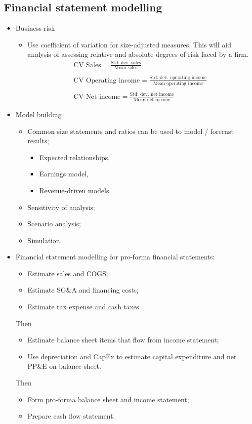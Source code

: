 \documentclass[../notes_compiled.tex]{subfiles}
\begin{document}
\subsection{Financial statement modelling}
\begin{itemize}
\item Business risk
\begin{itemize}
\item Use coefficient of variation for size-adjusted measures. This will aid analysis of assessing relative and absolute degrees of risk faced by a firm.
\begin{gather}
\text{CV Sales} = \frac{\text{Std. dev. sales}}{\text{Mean sales}} \\ \nonumber \\
\text{CV Operating income} = \frac{\text{Std. dev. operating income}}{\text{Mean operating income}} \\ \nonumber \\
\text{CV Net income} = \frac{\text{Std. dev. net income}}{\text{Mean net income}}
\end{gather}
\end{itemize}

\item Model building
\begin{itemize}
\item Common size statements and ratios can be used to model / forecast results;
\begin{itemize}
\item Expected relationships,
\item Earnings model,
\item Revenue-driven models.
\end{itemize}
\item Sensitivity of analysis;
\item Scenario analysis;
\item Simulation.
\end{itemize}

\item Financial statement modelling for pro-forma financial statements:
\begin{itemize}
\item Estimate sales and COGS;
\item Estimate SG\&A and financing costs;
\item Estimate tax expense and cash taxes.
\end{itemize}
Then
\begin{itemize}
\item Estimate balance sheet items that flow from income statement;
\item Use depreciation and CapEx to estimate capital expenditure and net PP\&E on balance sheet.
\end{itemize}
Then
\begin{itemize}
\item Form pro-forma balance sheet and income statement;
\item Prepare cash flow statement.
\end{itemize}



\end{itemize}
\end{document}
